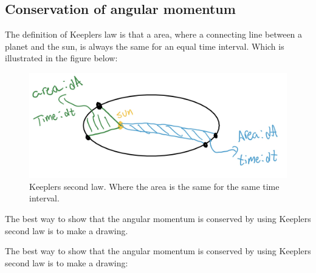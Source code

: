 \documentclass{article}
\begin{document}
\begin{multicols}{2}
\subsection{Conservation of angular momentum}
The definition of Keeplers law is that a area, where a connecting line between a planet and the sun, is always the same for an equal time interval. Which is illustrated in the figure below:


\begin{figure}[H]
	\centering
	\includegraphics[width=\linewidth]{K2L.jpg}
	\caption{Keeplers second law. Where the area is the same for the same time interval.}
	\label{fig:1bplot}
\end{figure}

The best way to show that the angular momentum is conserved by using Keeplers second law is to make a drawing.


The best way to show that the angular momentum is conserved by using Keeplers second law is to make a drawing:


\end{multicols}
\end{document}
